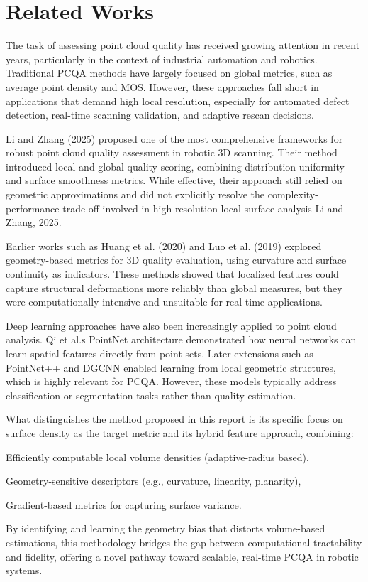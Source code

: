 \section{Related Works}
The task of assessing point cloud quality has received growing attention in recent years, particularly in the context of industrial automation and robotics. Traditional PCQA methods have largely focused on global metrics, such as average point density and MOS. However, these approaches fall short in applications that demand high local resolution, especially for automated defect detection, real-time scanning validation, and adaptive rescan decisions.

Li and Zhang (2025) proposed one of the most comprehensive frameworks for robust point cloud quality assessment in robotic 3D scanning. Their method introduced local and global quality scoring, combining distribution uniformity and surface smoothness metrics. While effective, their approach still relied on geometric approximations and did not explicitly resolve the complexity-performance trade-off involved in high-resolution local surface analysis Li and Zhang, 2025.

Earlier works such as Huang et al. (2020) and Luo et al. (2019) explored geometry-based metrics for 3D quality evaluation, using curvature and surface continuity as indicators. These methods showed that localized features could capture structural deformations more reliably than global measures, but they were computationally intensive and unsuitable for real-time applications.

Deep learning approaches have also been increasingly applied to point cloud analysis. Qi et al.s PointNet architecture demonstrated how neural networks can learn spatial features directly from point sets. Later extensions such as PointNet++ and DGCNN enabled learning from local geometric structures, which is highly relevant for PCQA. However, these models typically address classification or segmentation tasks rather than quality estimation.

What distinguishes the method proposed in this report is its specific focus on surface density as the target metric and its hybrid feature approach, combining:

Efficiently computable local volume densities (adaptive-radius based),

Geometry-sensitive descriptors (e.g., curvature, linearity, planarity),

Gradient-based metrics for capturing surface variance.

By identifying and learning the geometry bias that distorts volume-based estimations, this methodology bridges the gap between computational tractability and fidelity, offering a novel pathway toward scalable, real-time PCQA in robotic systems.